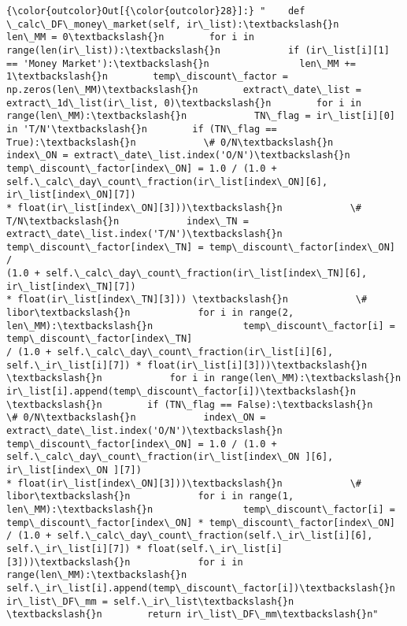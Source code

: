 \documentclass[11pt]{article}
\begin{document}
\begin{Verbatim}[commandchars=\\\{\}]
{\color{outcolor}Out[{\color{outcolor}28}]:} "    def \_calc\_DF\_money\_market(self, ir\_list):\textbackslash{}n        len\_MM = 0\textbackslash{}n        for i in range(len(ir\_list)):\textbackslash{}n            if (ir\_list[i][1] == 'Money Market'):\textbackslash{}n                len\_MM += 1\textbackslash{}n        temp\_discount\_factor = np.zeros(len\_MM)\textbackslash{}n        extract\_date\_list = extract\_1d\_list(ir\_list, 0)\textbackslash{}n        for i in range(len\_MM):\textbackslash{}n            TN\_flag = ir\_list[i][0] in 'T/N'\textbackslash{}n        if (TN\_flag == True):\textbackslash{}n            \# 0/N\textbackslash{}n            index\_ON = extract\_date\_list.index('O/N')\textbackslash{}n            temp\_discount\_factor[index\_ON] = 1.0 / (1.0 + self.\_calc\_day\_count\_fraction(ir\_list[index\_ON][6], ir\_list[index\_ON][7])                                                                 * float(ir\_list[index\_ON][3]))\textbackslash{}n            \# T/N\textbackslash{}n            index\_TN = extract\_date\_list.index('T/N')\textbackslash{}n            temp\_discount\_factor[index\_TN] = temp\_discount\_factor[index\_ON] /                                                                             (1.0 + self.\_calc\_day\_count\_fraction(ir\_list[index\_TN][6], ir\_list[index\_TN][7])                                                                              * float(ir\_list[index\_TN][3])) \textbackslash{}n            \# libor\textbackslash{}n            for i in range(2, len\_MM):\textbackslash{}n                temp\_discount\_factor[i] = temp\_discount\_factor[index\_TN]                                                             / (1.0 + self.\_calc\_day\_count\_fraction(ir\_list[i][6], self.\_ir\_list[i][7]) * float(ir\_list[i][3]))\textbackslash{}n                    \textbackslash{}n            for i in range(len\_MM):\textbackslash{}n                ir\_list[i].append(temp\_discount\_factor[i])\textbackslash{}n            \textbackslash{}n        if (TN\_flag == False):\textbackslash{}n            \# 0/N\textbackslash{}n            index\_ON = extract\_date\_list.index('O/N')\textbackslash{}n            temp\_discount\_factor[index\_ON] = 1.0 / (1.0 + self.\_calc\_day\_count\_fraction(ir\_list[index\_ON ][6], ir\_list[index\_ON ][7])                                                                              * float(ir\_list[index\_ON][3]))\textbackslash{}n            \# libor\textbackslash{}n            for i in range(1, len\_MM):\textbackslash{}n                temp\_discount\_factor[i] = temp\_discount\_factor[index\_ON] * temp\_discount\_factor[index\_ON]                                                              / (1.0 + self.\_calc\_day\_count\_fraction(self.\_ir\_list[i][6], self.\_ir\_list[i][7]) * float(self.\_ir\_list[i][3]))\textbackslash{}n            for i in range(len\_MM):\textbackslash{}n                self.\_ir\_list[i].append(temp\_discount\_factor[i])\textbackslash{}n            ir\_list\_DF\_mm = self.\_ir\_list\textbackslash{}n            \textbackslash{}n        return ir\_list\_DF\_mm\textbackslash{}n"
\end{Verbatim}
            
\end{document}
